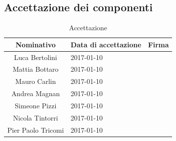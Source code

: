 \documentclass[a4paper,titlepage]{article}
\begin{document}
\subsection{Accettazione dei componenti}
\begin{table}[htbp]
	\begin{center}
		\setlength{\extrarowheight}{\jot}
		\begin{tabular}{|c|p{3.5cm}|p{6cm}|}
			\hline
			\textbf{Nominativo} & \textbf{Data di accettazione} & \textbf{Firma} \\[1ex]
			\hline
			Luca Bertolini	&	2017-01-10	& \\[1ex]
			\hline
			Mattia Bottaro		&	2017-01-10	& \\[1ex]
			\hline
			Mauro Carlin	&	2017-01-10	& \\[1ex]
			\hline
			Andrea Magnan	&	2017-01-10	& \\[1ex]
			\hline
			Simeone Pizzi	&	2017-01-10	& \\[1ex]
			\hline
			Nicola Tintorri	&	2017-01-10	& \\[1ex]
			\hline
			Pier Paolo Tricomi	&	2017-01-10	& \\[1ex]
			\hline
		\end{tabular}
	\end{center}
	\caption{Accettazione}
\end{table}
\end{document}
